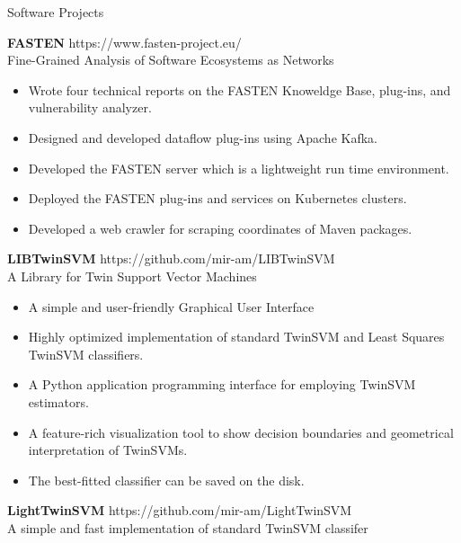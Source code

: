 \documentclass{resume} %
\newcounter{now}%
\begin{document}
\begin{rSection}{Software Projects}
	
	{\bf FASTEN} \hfill {https://www.fasten-project.eu/} \\ 
	Fine-Grained Analysis of Software Ecosystems as Networks \\
	
	
    \begin{itemize}
		\item Wrote four technical reports on the FASTEN Knoweldge Base, plug-ins, and vulnerability analyzer.
		\item Designed and developed dataflow plug-ins using Apache Kafka.
		\item Developed the FASTEN server which is a lightweight run time environment.
		\item Deployed the FASTEN plug-ins and services on Kubernetes clusters.
		\item Developed a web crawler for scraping coordinates of Maven packages.
	\end{itemize}
	
	{\bf LIBTwinSVM} \hfill {https://github.com/mir-am/LIBTwinSVM} \\ 
	A Library for Twin Support Vector Machines \\
	
	\begin{itemize}
		\item A simple and user-friendly Graphical User Interface
		\item Highly optimized implementation of standard TwinSVM and Least Squares TwinSVM classifiers.
		\item A Python application programming interface for employing TwinSVM estimators.
		\item A feature-rich visualization tool to show decision boundaries and geometrical interpretation of TwinSVMs.
		\item The best-fitted classifier can be saved on the disk.
	\end{itemize}
	
	{\bf LightTwinSVM} \hfill { https://github.com/mir-am/LightTwinSVM} \\ 
	A simple and fast implementation of standard TwinSVM classifer  \\
	

\end{rSection}
\end{document}
